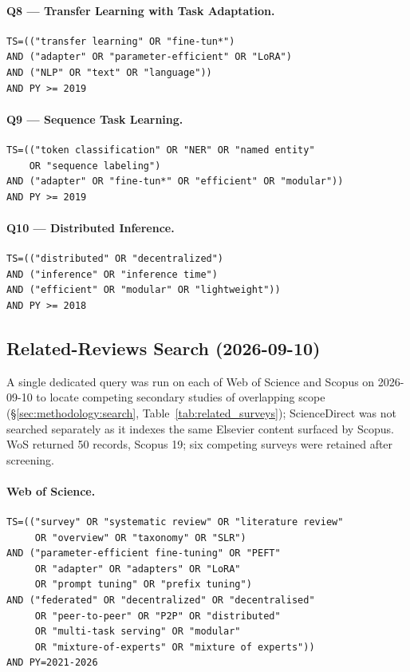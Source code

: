\paragraph{Q8 — Transfer Learning with Task Adaptation.}
\begin{verbatim}
TS=(("transfer learning" OR "fine-tun*")
AND ("adapter" OR "parameter-efficient" OR "LoRA")
AND ("NLP" OR "text" OR "language"))
AND PY >= 2019
\end{verbatim}

\paragraph{Q9 — Sequence Task Learning.}
\begin{verbatim}
TS=(("token classification" OR "NER" OR "named entity"
    OR "sequence labeling")
AND ("adapter" OR "fine-tun*" OR "efficient" OR "modular"))
AND PY >= 2019
\end{verbatim}

\paragraph{Q10 — Distributed Inference.}
\begin{verbatim}
TS=(("distributed" OR "decentralized")
AND ("inference" OR "inference time")
AND ("efficient" OR "modular" OR "lightweight"))
AND PY >= 2018
\end{verbatim}

\subsection*{Related-Reviews Search (2026-09-10)}
\label{app:db_queries:related}

A single dedicated query was run on each of Web of Science and Scopus on
2026-09-10 to locate competing secondary studies of overlapping scope
(\S\ref{sec:methodology:search}, Table~\ref{tab:related_surveys}); ScienceDirect
was not searched separately as it indexes the same Elsevier content surfaced by
Scopus. WoS returned 50 records, Scopus 19; six competing surveys were retained
after screening.

\paragraph{Web of Science.}
\begin{verbatim}
TS=(("survey" OR "systematic review" OR "literature review"
     OR "overview" OR "taxonomy" OR "SLR")
AND ("parameter-efficient fine-tuning" OR "PEFT"
     OR "adapter" OR "adapters" OR "LoRA"
     OR "prompt tuning" OR "prefix tuning")
AND ("federated" OR "decentralized" OR "decentralised"
     OR "peer-to-peer" OR "P2P" OR "distributed"
     OR "multi-task serving" OR "modular"
     OR "mixture-of-experts" OR "mixture of experts"))
AND PY=2021-2026
\end{verbatim}

